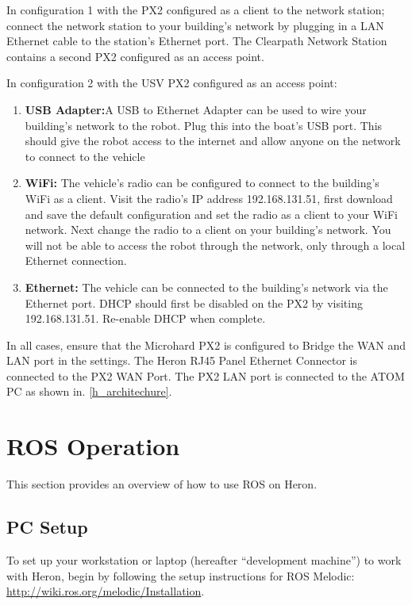 \documentclass[]{clearpath-latex/clearpath-manual}
\begin{document}
In configuration 1 with the PX2 configured as a client to the network station; connect the network station to your building's network by plugging in a LAN Ethernet cable to the station's Ethernet port. The Clearpath Network Station contains a second PX2 configured as an access point.

In configuration 2 with the USV PX2 configured as an access point:

\begin{enumerate}
\item \textbf{USB Adapter:}A USB to Ethernet Adapter can be used to wire your building's network to the robot. Plug this into the boat's USB port. This should give the robot access to the internet and allow anyone on the network to connect to the vehicle
\item \textbf{WiFi:} The vehicle's radio can be configured to connect to the building's WiFi as a client. Visit the radio's IP address 192.168.131.51, first download and save the default configuration and set the radio as a client to your WiFi network. Next change the radio to a client on your building's network. You will not be able to access the robot through the network, only through a local Ethernet connection.
\item \textbf{Ethernet:} The vehicle can be connected to the building's network via the Ethernet port. DHCP should first be disabled on the PX2 by visiting 192.168.131.51. Re-enable DHCP when complete.
\end{enumerate}

In all cases, ensure that the Microhard PX2 is configured to Bridge the WAN and LAN port in the settings. The Heron RJ45 Panel Ethernet Connector is connected to the PX2 WAN Port. The PX2 LAN port is connected to the ATOM PC as shown in. \ref{h_architechure}.

\newpage

\section{ROS Operation}
This section provides an overview of how to use ROS on Heron.

\subsection{PC Setup} \label{pcsetup}

To set up your workstation or laptop (hereafter “development machine”) to work with Heron, begin by following the setup instructions for ROS Melodic: \url{http://wiki.ros.org/melodic/Installation}.
\end{document}
